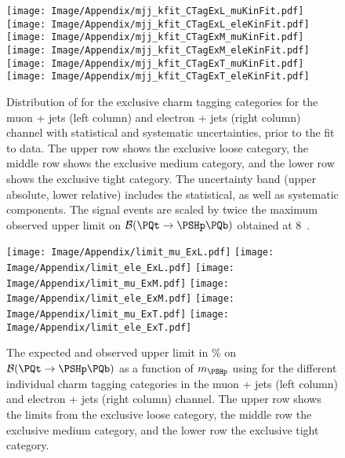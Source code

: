\begin{figure}
\centering  
\texttt{[image: Image/Appendix/mjj\_kfit\_CTagExL\_muKinFit.pdf]}
\texttt{[image: Image/Appendix/mjj\_kfit\_CTagExL\_eleKinFit.pdf]}
\texttt{[image: Image/Appendix/mjj\_kfit\_CTagExM\_muKinFit.pdf]}
\texttt{[image: Image/Appendix/mjj\_kfit\_CTagExM\_eleKinFit.pdf]}
\texttt{[image: Image/Appendix/mjj\_kfit\_CTagExT\_muKinFit.pdf]}
\texttt{[image: Image/Appendix/mjj\_kfit\_CTagExT\_eleKinFit.pdf]}
\caption{Distribution of \mjj for the exclusive charm tagging 
    categories for the muon + jets (left column) and electron + jets 
    (right column) channel with statistical and systematic 
    uncertainties, prior to the fit to data. The upper row shows the 
    exclusive loose category, the middle row shows the exclusive 
    medium category, and the lower row shows the exclusive tight 
    category. The uncertainty band (upper absolute, lower relative)
    includes the statistical, as well as systematic components. The 
    signal events are scaled by twice the maximum observed upper limit on
    $\mathcal{B}(\PQt \to \PSHp\PQb)$ obtained at 
    8\TeV~\cite{Khachatryan:2015uua}.}
    \label{fig:mjjPreFit}
\end{figure}

\begin{figure}
\centering
\texttt{[image: Image/Appendix/limit\_mu\_ExL.pdf]}
\texttt{[image: Image/Appendix/limit\_ele\_ExL.pdf]}
\texttt{[image: Image/Appendix/limit\_mu\_ExM.pdf]}
\texttt{[image: Image/Appendix/limit\_ele\_ExM.pdf]}
\texttt{[image: Image/Appendix/limit\_mu\_ExT.pdf]}
\texttt{[image: Image/Appendix/limit\_ele\_ExT.pdf]}
\caption{The expected and observed upper limit in \% on 
    $\mathcal{B} (\PQt \to \PSHp\PQb)$ as a function of $m_{\PSHp}$ 
    using \mjj for the different individual charm tagging categories 
    in the muon + jets (left column) and electron + jets (right column) 
    channel. The upper row shows the limits from the exclusive loose 
    category, the middle row the exclusive medium category, and the 
    lower row the exclusive tight category.}
    \label{fig:limitAppend}
\end{figure}

